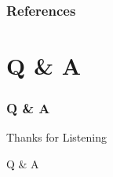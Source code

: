 \documentclass[
	12pt, %
	aspectratio=169, %
]{beamer}
\begin{document}
\begin{frame}
	\frametitle{References}

	\printbibliography
\end{frame}


\section{Q \& A}

\begin{frame}
    \frametitle{Q \& A}
	\begin{center}
		{\Huge Thanks for Listening}
		
		\bigskip\bigskip %
		
		{\LARGE Q \& A}

	\end{center}
\end{frame}

\end{document}
